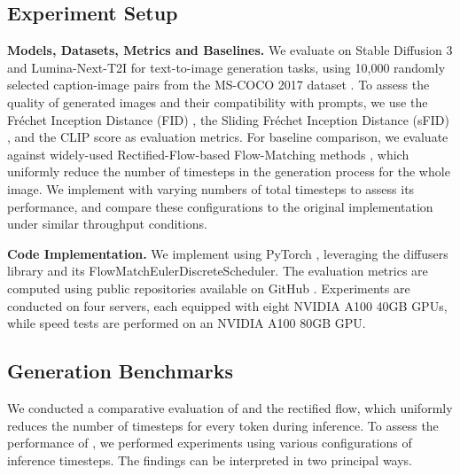 \subsection{Experiment Setup}

\textbf{Models, Datasets, Metrics and Baselines.}
We evaluate \ourmethod{} on Stable Diffusion 3 \cite{esser2024scalingrectifiedflowtransformers} and Lumina-Next-T2I \cite{gao2024luminat2xtransformingtextmodality} for text-to-image generation tasks, using 10,000 randomly selected caption-image pairs from the MS-COCO 2017 dataset \cite{lin2014microsoftcoco}. To assess the quality of generated images and their compatibility with prompts, we use the Fréchet Inception Distance (FID) \cite{heusel2017gansfid}, the Sliding Fréchet Inception Distance (sFID) \cite{heusel2017gansfid}, and the CLIP score \cite{hessel2021clipscore} as evaluation metrics. For baseline comparison, we evaluate \ourmethod{} against widely-used Rectified-Flow-based Flow-Matching methods \cite{liu2022flow, albergo2022building, esser2024scalingrectifiedflowtransformers, lipman2022flow, dao2023flowmatchinglatentspace, fischer2023boosting}, which uniformly reduce the number of timesteps in the generation process for the whole image. We implement \ourmethod{} with varying numbers of total timesteps to assess its performance, and compare these configurations to the original implementation under similar throughput conditions.

\noindent \textbf{Code Implementation.} We implement \ourmethod{} using PyTorch \cite{Adam2019PyTorch}, leveraging the diffusers library \cite{von-platen-etal-2022-diffusers} and its FlowMatchEulerDiscreteScheduler. The evaluation metrics are computed using public repositories available on GitHub \cite{Seitzer2020FID, Hu2022sFID, taited2023CLIPScore}. Experiments are conducted on four servers, each equipped with eight NVIDIA A100 40GB GPUs, while speed tests are performed on an NVIDIA A100 80GB GPU.






\subsection{Generation Benchmarks}
We conducted a comparative evaluation of \ourmethod{} and the rectified flow, which uniformly reduces the number of timesteps for every token during inference. To assess the performance of \ourmethod{}, we performed experiments using various configurations of inference timesteps. The findings can be interpreted in two principal ways.

